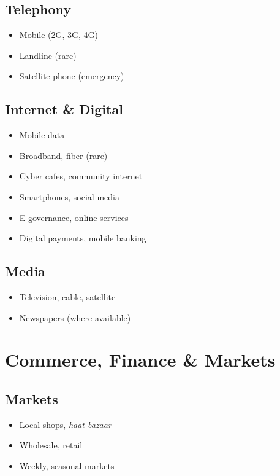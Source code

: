 \documentclass[11pt,a4paper]{article}
\begin{document}
\subsection{Telephony}
\begin{itemize}
    \item Mobile (2G, 3G, 4G)
    \item Landline (rare)
    \item Satellite phone (emergency)
\end{itemize}

\subsection{Internet \& Digital}
\begin{itemize}
    \item Mobile data
    \item Broadband, fiber (rare)
    \item Cyber cafes, community internet
    \item Smartphones, social media
    \item E-governance, online services
    \item Digital payments, mobile banking
\end{itemize}

\subsection{Media}
\begin{itemize}
    \item Television, cable, satellite
    \item Newspapers (where available)
\end{itemize}

\section{Commerce, Finance \& Markets}

\subsection{Markets}
\begin{itemize}
    \item Local shops, \textit{haat bazaar}
    \item Wholesale, retail
    \item Weekly, seasonal markets
\end{itemize}
\end{document}
